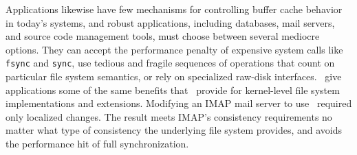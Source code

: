 \begin{comment}
But different extensions within a file system, or different
 applications over the file system, may require different types of
 consistency semantics, and performance suffers when lower layers are
 unnecessarily denied the opportunity to reorder writes;
\Patches\ can implement many consistency mechanisms, including
 soft updates and journaling, and can allow combinations of different
 consistency protocols to exist at the same time.
\Patches\ provide a simple and effective way for such extensions to
 express their requirements of the storage system, adding to the
 requirements already expressed by the file system itself.
\end{comment}


Applications likewise have few mechanisms
 for controlling buffer cache behavior in today's systems, and
%
robust applications, including databases, mail servers, and source code
 management tools, must choose between several mediocre options.
%
They can accept the performance penalty of expensive system calls like
 \texttt{fsync} and \texttt{sync}, use tedious and fragile sequences
 of operations that count on particular file system semantics, or
 rely on specialized raw-disk interfaces.
%
\Patchgroups\ give applications some of the same benefits that \patches\ provide
 for kernel-level file system implementations and extensions.
%
Modifying an IMAP mail server to use \patchgroups\ required only localized
 changes.  The result meets IMAP's consistency requirements no
 matter what type of consistency the underlying file system provides, and
 avoids the performance hit of full synchronization.


\begin{comment}
Our file system modules impose soft updates-style \patch\ requirements by
 default, since doing so requires some knowledge of the file system's
 structures; we have also written a journal module that can change
 existing dependencies to express either full or metadata-only journaling.
%
A file system module not interested in supporting soft updates support
 could instead impose no \patch\ requirements, and count on the journal
 module to provide a consistency guarantee.


The \Kudos\ storage system implementation is decomposed entirely into
 pluggable \modules\ that manipulate \patches, hopefully making the system
 as a whole more configurable, extensible, and easier to understand.
%
Any storage system \module\ can generate \patches; other modules can examine
 them and modify them when required.
%
\Patch\ dependencies are obeyed by all other storage system layers, allowing
 them to be passed through layers such as loopback block devices.
%
As a result, the loosely-coupled \modules\ that implement a file system
 can cooperate to enforce strong and often complex consistency guarantees,
 even though each \module\ only does a small part of the work.
\end{comment}


